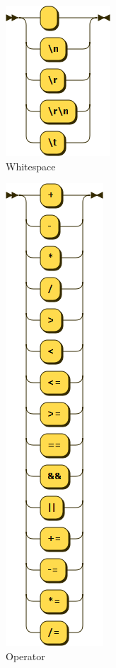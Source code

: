 \begin{figure}[h!]
\centering
\includegraphics[scale=0.5]{kepek/rr_whitespace.png}
\caption{Whitespace}
\label{fig:rr_whitespace}
\end{figure}

\begin{figure}[h!]
\centering
\includegraphics[scale=1]{kepek/rr_operator.png}
\caption{Operator}
\label{fig:rr_operator}
\end{figure}

